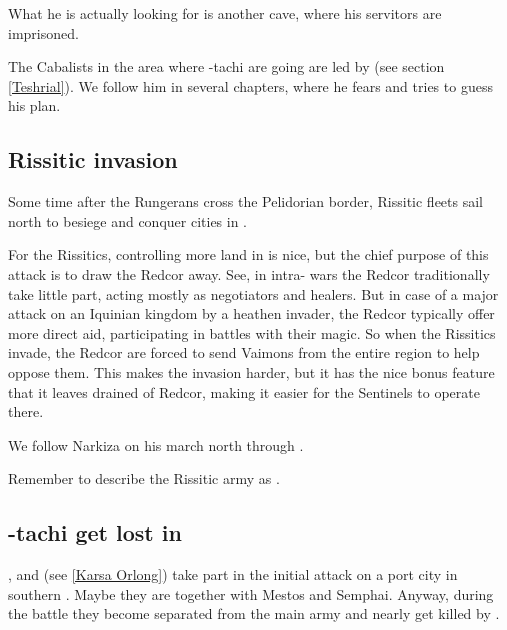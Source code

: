 What he is actually looking for is another cave, where his servitors are imprisoned. 

The Cabalists in the area where \Shilred-tachi are going are led by \Teshrial{} (see section \ref{Teshrial}). We follow him in several chapters, where he fears \Ishnaruchaefir{} and tries to guess his plan. 






\subsection{Rissitic invasion}
Some time after the Rungerans cross the Pelidorian border, Rissitic fleets sail north to besiege and conquer cities in \Scyrum. 


For the Rissitics, controlling more land in \Velcad{} is nice, but the chief purpose of this attack is to draw the Redcor away. See, in intra-\Velcadian{} wars the Redcor traditionally take little part, acting mostly as negotiators and healers. But in case of a major attack on an Iquinian kingdom by a heathen invader, the Redcor typically offer more direct aid, participating in battles with their magic. So when the Rissitics invade, the Redcor are forced to send Vaimons from the entire region to help oppose them. 
This makes the invasion harder, but it has the nice bonus feature that it leaves \Malcur drained of Redcor, making it easier for the Sentinels to operate there. 

We follow Narkiza on his march north through \Scyrum. 



Remember to describe the Rissitic army as .







\subsection{\Shilred-tachi get lost in \Nyx}
\Shilred{}, \Dzasselid{} and \KarsaOrlong{} (see \ref{Karsa Orlong}) take part in the initial attack on a port city in southern \Scyrum. Maybe they are together with Mestos and Semphai. Anyway, during the battle they become separated from the main army and nearly get killed by \banes. %

